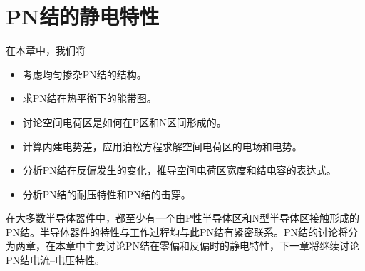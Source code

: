 \chapter{PN结的静电特性}

在本章中，我们将
\begin{itemize}
    \item 考虑均匀掺杂PN结的结构。
    \item 求PN结在热平衡下的能带图。
    \item 讨论空间电荷区是如何在P区和N区间形成的。
    \item 计算内建电势差，应用泊松方程求解空间电荷区的电场和电势。
    \item 分析PN结在反偏发生的变化，推导空间电荷区宽度和结电容的表达式。
    \item 分析PN结的耐压特性和PN结的击穿。
\end{itemize}
在大多数半导体器件中，都至少有一个由P性半导体区和N型半导体区接触形成的PN结。半导体器件的特性与工作过程均与此PN结有紧密联系。PN结的讨论将分为两章，在本章中主要讨论PN结在零偏和反偏时的静电特性，下一章将继续讨论PN结电流--电压特性。



